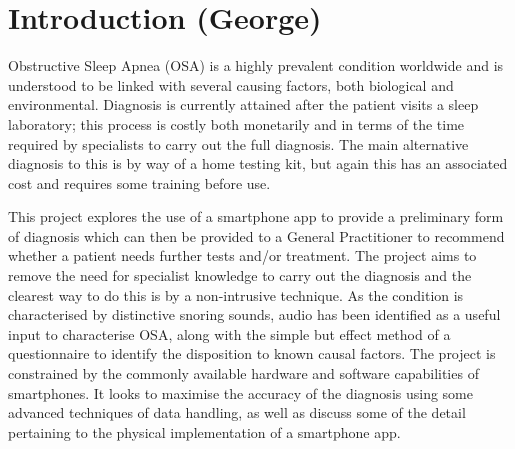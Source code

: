\chapter{Introduction (George)}
\label{ch:introduction}

Obstructive Sleep Apnea (OSA) is a highly prevalent condition worldwide and is understood to be linked with several causing factors, both biological and environmental. Diagnosis is currently attained after the patient visits a sleep laboratory; this process is costly both monetarily and in terms of the time required by specialists to carry out the full diagnosis. The main alternative diagnosis to this is by way of a home testing kit, but again this has an associated cost and requires some training before use.

This project explores the use of a smartphone app to provide a preliminary form of diagnosis which can then be provided to a General Practitioner to recommend whether a patient needs further tests and/or treatment. The project aims to remove the need for specialist knowledge to carry out the diagnosis and the clearest way to do this is by a non-intrusive technique. As the condition is characterised by distinctive snoring sounds, audio has been identified as a useful input to characterise OSA, along with the simple but effect method of a questionnaire to identify the disposition to known causal factors. The project is constrained by the commonly available hardware and software capabilities of smartphones. It looks to maximise the accuracy of the diagnosis using some advanced techniques of data handling, as well as discuss some of the detail pertaining to the physical implementation of a smartphone app.